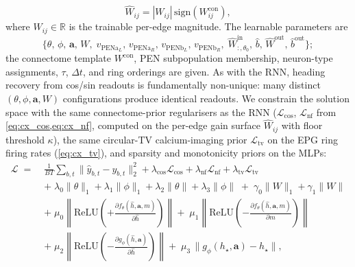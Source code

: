 \documentclass[11pt]{article}
\def\relu{\mathrm{ReLU}}
\begin{document}
\begin{equation}
\hat{W}_{ij} = |W_{ij}|\,\mathrm{sign}(W^{\mathrm{con}}_{ij}),
\label{eq:cx_gnn_w}
\end{equation}
where $W_{ij}\in\mathbb{R}$ is the trainable per-edge magnitude. The learnable parameters are
\begin{equation*}
\big\{\theta,\,\phi,\,\mathbf{a},\,W,\;
v_{\mathrm{PENa}_L},\,v_{\mathrm{PENa}_R},\,v_{\mathrm{PENb}_L},\,v_{\mathrm{PENb}_R},\;
\hat{W}^{\mathrm{in}}_{:,\theta_0},\,\hat{b},\,\hat{W}^{\mathrm{out}},\,\hat{b}^{\mathrm{out}}\big\};
\end{equation*}
the connectome template $W^{\mathrm{con}}$, PEN subpopulation membership, neuron-type assignments, $\tau$, $\Delta t$, and ring orderings are given.
As with the RNN, heading recovery from cos/sin readouts is fundamentally non-unique: many distinct $(\theta,\phi,\mathbf{a},W)$ configurations produce identical readouts. We constrain the solution space with the same connectome-prior regularisers as the RNN ($\mathcal{L}_{\mathrm{cos}}$, $\mathcal{L}_{\mathrm{nf}}$ from \cref{eq:cx_cos,eq:cx_nf}, computed on the per-edge gain surface $\hat{W}_{ij}$ with floor threshold $\kappa$), the same circular-TV calcium-imaging prior $\mathcal{L}_{\mathrm{tv}}$ on the EPG ring firing rates (\cref{eq:cx_tv}), and sparsity and monotonicity priors on the MLPs:
\begin{align}
\mathcal{L} \;=\;& \tfrac{1}{BT}\sum_{b,t}\|\hat{y}_{b,t} - y_{b,t}\|_2^2
+ \lambda_{\mathrm{cos}}\mathcal{L}_{\mathrm{cos}}
+ \lambda_{\mathrm{nf}}\mathcal{L}_{\mathrm{nf}}
+ \lambda_{\mathrm{tv}}\mathcal{L}_{\mathrm{tv}} \nonumber\\
& +\;\lambda_0\|\theta\|_1 + \lambda_1\|\phi\|_1 + \lambda_2\|\theta\| + \lambda_3\|\phi\|
   \;+\;\gamma_0\|W\|_1 + \gamma_1\|W\| \nonumber\\
& +\;\mu_0\!\left\|\relu\!\left(+\tfrac{\partial f_\theta(\hat{h},\mathbf{a},m)}{\partial \hat{h}}\right)\right\|
   +\;\mu_1\!\left\|\relu\!\left(-\tfrac{\partial f_\theta(\hat{h},\mathbf{a},m)}{\partial m}\right)\right\| \nonumber\\
& +\;\mu_2\!\left\|\relu\!\left(-\tfrac{\partial g_\phi(\hat{h},\mathbf{a})}{\partial \hat{h}}\right)\right\|
   +\;\mu_3\,\big\|g_\phi(h_\star,\mathbf{a})-h_\star\big\|,
\label{eq:cx_gnn_loss}
\end{align}
\end{document}
